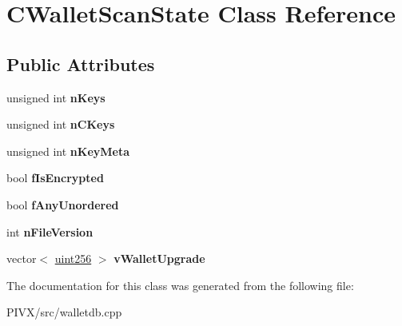 \hypertarget{class_c_wallet_scan_state}{}\section{C\+Wallet\+Scan\+State Class Reference}
\label{class_c_wallet_scan_state}
\subsection*{Public Attributes}
\begin{DoxyCompactItemize}
\item 
\mbox{\label{class_c_wallet_scan_state_a8a6e0071320cbfffc6d7d49ded5d506e}} 
unsigned int {\bfseries n\+Keys}
\item 
\mbox{\label{class_c_wallet_scan_state_ae1316ee4cfdf8fbff91ca32a5d0f2b6a}} 
unsigned int {\bfseries n\+C\+Keys}
\item 
\mbox{\label{class_c_wallet_scan_state_a2cfbc8894839188b57be22e72f2d6de4}} 
unsigned int {\bfseries n\+Key\+Meta}
\item 
\mbox{\label{class_c_wallet_scan_state_a13c5139c5966079d1be4c739666c5243}} 
bool {\bfseries f\+Is\+Encrypted}
\item 
\mbox{\label{class_c_wallet_scan_state_acafa7b6a27ec1a4714e9a7b331067e9d}} 
bool {\bfseries f\+Any\+Unordered}
\item 
\mbox{\label{class_c_wallet_scan_state_ad68ce61566ee2baf3d7b04b1390942d1}} 
int {\bfseries n\+File\+Version}
\item 
\mbox{\label{class_c_wallet_scan_state_a6cbf626ca5a0275f0469684f22dff12f}} 
vector$<$ \mbox{\hyperlink{classuint256}{uint256}} $>$ {\bfseries v\+Wallet\+Upgrade}
\end{DoxyCompactItemize}


The documentation for this class was generated from the following file\+:\begin{DoxyCompactItemize}
\item 
P\+I\+V\+X/src/walletdb.\+cpp\end{DoxyCompactItemize}
